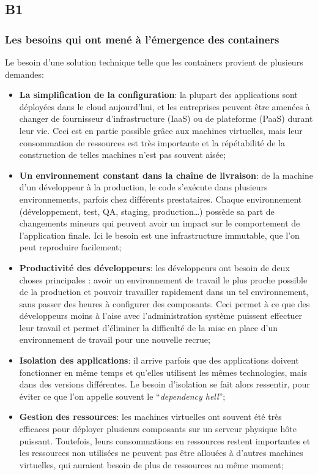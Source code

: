 \subsection{B1}
    \subsubsection{Les besoins qui ont mené à l'émergence des containers}
        Le besoin d'une solution technique telle que les containers provient de plusieurs demandes\cite{realWorldDocker}:
        \begin{itemize}
            \item \textbf{La simplification de la configuration}: la plupart des applications sont déployées dans le cloud aujourd'hui, et les entreprises peuvent être amenées à changer de fournisseur d'infrastructure (IaaS) ou de plateforme (PaaS) durant leur vie. Ceci est en partie possible grâce aux machines virtuelles, mais leur consommation de ressources est très importante et la répétabilité de la construction de telles machines n'est pas souvent aisée;
            \item \textbf{Un environnement constant dans la chaîne de livraison}: de la machine d'un développeur à la production, le code s'exécute dans plusieurs environnements, parfois chez différents prestataires. Chaque environnement (développement, test, QA, staging, production\dots) possède sa part de changements mineurs qui peuvent avoir un impact sur le comportement de l'application finale. Ici le besoin est une infrastructure immutable, que l'on peut reproduire facilement;
            \item \textbf{Productivité des développeurs}: les développeurs ont besoin de deux choses principales : avoir un environnement de travail le plus proche possible de la production et pouvoir travailler rapidement dans un tel environnement, sans passer des heures à configurer des composants. Ceci permet à ce que des développeurs moins à l'aise avec l'administration système puissent effectuer leur travail et permet d'éliminer la difficulté de la mise en place d'un environnement de travail pour une nouvelle recrue;
            \item \textbf{Isolation des applications}: il arrive parfois que des applications doivent fonctionner en même temps et qu'elles utilisent les mêmes technologies, mais dans des versions différentes. Le besoin d'isolation se fait alors ressentir, pour éviter ce que l'on appelle souvent le \enquote{\textit{dependency hell}};
            \item \textbf{Gestion des ressources}: les machines virtuelles ont souvent été très efficaces pour déployer plusieurs composants sur un serveur physique hôte puissant. Toutefois, leurs consommations en ressources restent importantes et les ressources non utilisées ne peuvent pas être allouées à d'autres machines virtuelles, qui auraient besoin de plus de ressources au même moment;

\end{itemize}
